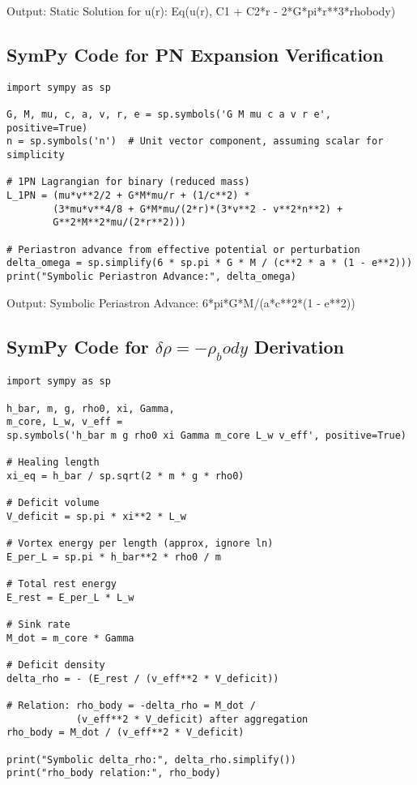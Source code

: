\documentclass{article}
\begin{document}
Output: Static Solution for u(r): Eq(u(r), C1 + C2*r - 2*G*pi*r**3*rhobody)

\subsection{SymPy Code for PN Expansion Verification}

\begin{verbatim}
import sympy as sp

G, M, mu, c, a, v, r, e = sp.symbols('G M mu c a v r e', positive=True)
n = sp.symbols('n')  # Unit vector component, assuming scalar for simplicity

# 1PN Lagrangian for binary (reduced mass)
L_1PN = (mu*v**2/2 + G*M*mu/r + (1/c**2) *
        (3*mu*v**4/8 + G*M*mu/(2*r)*(3*v**2 - v**2*n**2) +
        G**2*M**2*mu/(2*r**2)))

# Periastron advance from effective potential or perturbation
delta_omega = sp.simplify(6 * sp.pi * G * M / (c**2 * a * (1 - e**2)))
print("Symbolic Periastron Advance:", delta_omega)
\end{verbatim}

Output: Symbolic Periastron Advance: 6*pi*G*M/(a*c**2*(1 - e**2))

\subsection{SymPy Code for $\delta\rho = -\rho_body$ Derivation}

\begin{verbatim}
import sympy as sp

h_bar, m, g, rho0, xi, Gamma,
m_core, L_w, v_eff =
sp.symbols('h_bar m g rho0 xi Gamma m_core L_w v_eff', positive=True)

# Healing length
xi_eq = h_bar / sp.sqrt(2 * m * g * rho0)

# Deficit volume
V_deficit = sp.pi * xi**2 * L_w

# Vortex energy per length (approx, ignore ln)
E_per_L = sp.pi * h_bar**2 * rho0 / m

# Total rest energy
E_rest = E_per_L * L_w

# Sink rate
M_dot = m_core * Gamma

# Deficit density
delta_rho = - (E_rest / (v_eff**2 * V_deficit))

# Relation: rho_body = -delta_rho = M_dot /
            (v_eff**2 * V_deficit) after aggregation
rho_body = M_dot / (v_eff**2 * V_deficit)

print("Symbolic delta_rho:", delta_rho.simplify())
print("rho_body relation:", rho_body)
\end{verbatim}
\end{document}
